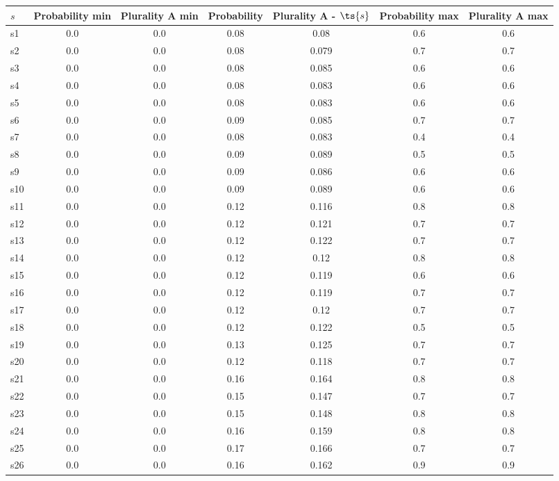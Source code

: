 \documentclass{article}
\begin{document}
\noindent\begin{tabular}{|l|c|c|c|c|c|c|}
\hline
$s$& Probability min & Plurality A min & Probability & Plurality A - $\ts{s}$ & Probability max & Plurality A max\\
\hline
s1 &0.0 & 0.0 & 0.08 & 0.08 & 0.6 & 0.6\\
\hline
s2 &0.0 & 0.0 & 0.08 & 0.079 & 0.7 & 0.7\\
\hline
s3 &0.0 & 0.0 & 0.08 & 0.085 & 0.6 & 0.6\\
\hline
s4 &0.0 & 0.0 & 0.08 & 0.083 & 0.6 & 0.6\\
\hline
s5 &0.0 & 0.0 & 0.08 & 0.083 & 0.6 & 0.6\\
\hline
s6 &0.0 & 0.0 & 0.09 & 0.085 & 0.7 & 0.7\\
\hline
s7 &0.0 & 0.0 & 0.08 & 0.083 & 0.4 & 0.4\\
\hline
s8 &0.0 & 0.0 & 0.09 & 0.089 & 0.5 & 0.5\\
\hline
s9 &0.0 & 0.0 & 0.09 & 0.086 & 0.6 & 0.6\\
\hline
s10 &0.0 & 0.0 & 0.09 & 0.089 & 0.6 & 0.6\\
\hline
s11 &0.0 & 0.0 & 0.12 & 0.116 & 0.8 & 0.8\\
\hline
s12 &0.0 & 0.0 & 0.12 & 0.121 & 0.7 & 0.7\\
\hline
s13 &0.0 & 0.0 & 0.12 & 0.122 & 0.7 & 0.7\\
\hline
s14 &0.0 & 0.0 & 0.12 & 0.12 & 0.8 & 0.8\\
\hline
s15 &0.0 & 0.0 & 0.12 & 0.119 & 0.6 & 0.6\\
\hline
s16 &0.0 & 0.0 & 0.12 & 0.119 & 0.7 & 0.7\\
\hline
s17 &0.0 & 0.0 & 0.12 & 0.12 & 0.7 & 0.7\\
\hline
s18 &0.0 & 0.0 & 0.12 & 0.122 & 0.5 & 0.5\\
\hline
s19 &0.0 & 0.0 & 0.13 & 0.125 & 0.7 & 0.7\\
\hline
s20 &0.0 & 0.0 & 0.12 & 0.118 & 0.7 & 0.7\\
\hline
s21 &0.0 & 0.0 & 0.16 & 0.164 & 0.8 & 0.8\\
\hline
s22 &0.0 & 0.0 & 0.15 & 0.147 & 0.7 & 0.7\\
\hline
s23 &0.0 & 0.0 & 0.15 & 0.148 & 0.8 & 0.8\\
\hline
s24 &0.0 & 0.0 & 0.16 & 0.159 & 0.8 & 0.8\\
\hline
s25 &0.0 & 0.0 & 0.17 & 0.166 & 0.7 & 0.7\\
\hline
s26 &0.0 & 0.0 & 0.16 & 0.162 & 0.9 & 0.9\\
\hline

\end{tabular}
\end{document}
